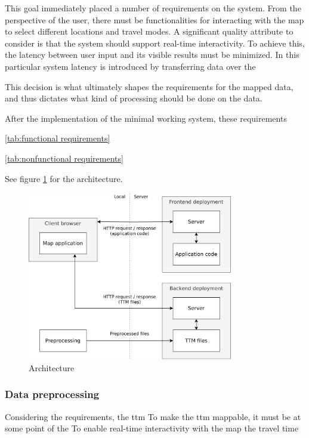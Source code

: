 This goal immediately placed a number of requirements on the system.
From the perspective of the user,
there must be functionalities for interacting with the map to
select different locations and travel modes.
A significant quality attribute to consider is that the system should
support real-time interactivity.
To achieve this, the latency between user input and
its visible results must be minimized.
In this particular system latency is introduced by transferring data over the

This decision is what ultimately shapes the requirements for the mapped data,
and thus dictates what kind of processing should be done on the data.

After the implementation of the minimal working system, these requirements


\ref{tab:functional requirements}



\ref{tab:nonfunctional requirements}



See figure \ref{fig:architechture} for the architecture.

\begin{figure}[H]
	\centering
	\includegraphics[width=0.8\textwidth]{visual/figures/diagrams/architechture.png}
	\caption{Architecture}
	\label{fig:architechture}
\end{figure}

\subsubsection{Data preprocessing}
Considering the requirements, the \acrshort{ttm}
To make the \acrshort{ttm} mappable, it must be at some point of the
To enable real-time interactivity with the map the travel time

